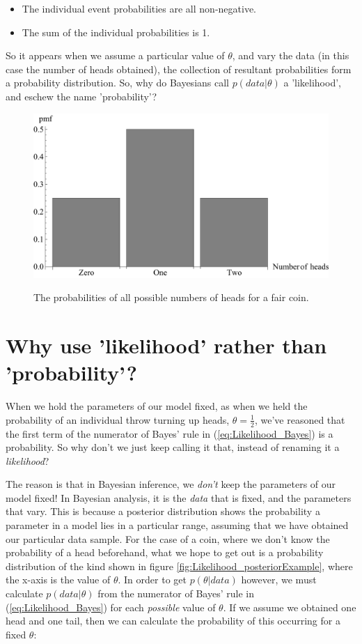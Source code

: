 \documentclass[11pt,fullpage]{book}
\begin{document}
\begin{itemize}
\item The individual event probabilities are all non-negative.
\item The sum of the individual probabilities is 1.
\end{itemize}

So it appears when we assume a particular value of $\theta$, and vary the data (in this case the number of heads obtained), the collection of resultant probabilities form a probability distribution. So, why do Bayesians call $p(data|\theta)$ a 'likelihood', and eschew the name 'probability'?

\begin{figure}
\centering
\scalebox{0.5} 
{\includegraphics{Likelihood_fairCoin.pdf}}
\caption{The probabilities of all possible numbers of heads for a fair coin.}\label{fig:Likelihood_fairCoin}
\end{figure}

\section{Why use 'likelihood' rather than 'probability'?}
When we hold the parameters of our model fixed, as when we held the probability of an individual throw turning up heads, $\theta=\frac{1}{2}$, we've reasoned that the first term of the numerator of Bayes' rule in (\ref{eq:Likelihood_Bayes}) is a probability. So why don't we just keep calling it that, instead of renaming it a \textit{likelihood}? 

The reason is that in Bayesian inference, we \textit{don't} keep the parameters of our model fixed! In Bayesian analysis, it is the \textit{data} that is fixed, and the parameters that vary. This is because a posterior distribution shows the probability a parameter in a model lies in a particular range, assuming that we have obtained our particular data sample. For the case of a coin, where we don't know the probability of a head beforehand, what we hope to get out is a probability distribution of the kind shown in figure \ref{fig:Likelihood_posteriorExample}, where the x-axis is the value of $\theta$. In order to get $p(\theta|data)$ however, we must calculate $p(data|\theta)$ from the numerator of Bayes' rule in (\ref{eq:Likelihood_Bayes}) for each \textit{possible} value of $\theta$. If we assume we obtained one head and one tail, then we can calculate the probability of this occurring for a fixed $\theta$:
\end{document}
